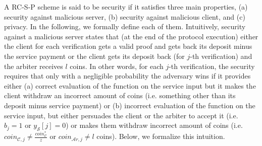 A RC-S-P scheme is said to be security if it satisfies  three main properties,   (a)  security against malicious server, (b) security against malicious client, and (c) privacy.  In the following, we formally define each of them. Intuitively, security against a malicious server states that (at the end of the protocol execution) either the client for each verification gets a valid proof and gets back its deposit minus the service payment or the client gets its deposit back (for $j$-th verification) and the arbiter receives $l$ coins. In other words, for each  $j$-th verification, the security requires that only with a negligible probability the adversary wins if it  provides either (a)  correct evaluation of the function on the service input but it makes the client  withdraw an incorrect amount of coins (i.e. something other than its deposit minus service payment) or (b) incorrect evaluation of the function on the service input,  but either persuades the client or the arbiter to accept it (i.e.  $b_{\scriptscriptstyle j}=1$ or $y_{\scriptscriptstyle\mathcal S}[j]=0$) or makes them  withdraw incorrect amount of coins (i.e. $coin_{\scriptscriptstyle\mathcal{C},j}\neq \frac{coin_{\scriptscriptstyle\mathcal C}^{\scriptscriptstyle*}}{z}$ or  $coin_{\scriptscriptstyle\mathcal{A}r,j}\neq l$ coins).  Below, we formalize this intuition. 






